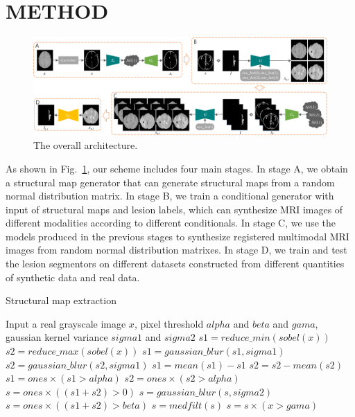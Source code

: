 \documentclass[runningheads]{llncs}
\begin{document}
\section{METHOD}
\label{method}
\begin{figure}[t]
	\centering
	\includegraphics[width=1\textwidth]{figures/architecture}
	\caption{The overall architecture. 
	}
	\label{architecture}
\end{figure}
As shown in Fig.~\ref{architecture}, our scheme includes four main stages. In stage A, we obtain a structural map generator that can generate structural maps from a random normal distribution matrix. 
In stage B, we train a conditional generator with input of structural maps and lesion labels, which can synthesize MRI images of different modalities according to different conditionals.
In stage C, we use the models produced in the previous stages to synthesize registered multimodal MRI images from random normal distribution matrixes. 
In stage D, we train and test the lesion segmentors on different datasets constructed from different quantities of synthetic data and real data.

\begin{algorithm}
	\caption{Structural map extraction}
	\label{alg:1}
	\begin{algorithmic}[1]
		\State Input a real grayscale image $x$,
		pixel threshold $alpha$ and $beta$ and $gama$,
		gaussian kernel variance $sigma1$ and $sigma2$
		\State $s1 = reduce\_min(sobel(x))$
		\State $s2 = reduce\_max(sobel(x))$
		\State $s1 = gaussian\_blur(s1,sigma1)$
		\State $s2 = gaussian\_blur(s2,sigma1)$
		\State $s1 = mean(s1) - s1$
		\State $s2 = s2 - mean(s2)$
		\State $s1 = ones \times (s1 > alpha)$
		\State $s2 = ones \times (s2 > alpha)$
		\State $s = ones \times ((s1 + s2)> 0)$
		\State $s = gaussian\_blur(s,sigma2)$
		\State $s = ones \times ((s1 + s2)> beta)$
		\State $s = medfilt(s)$
		\State $s = s \times (x > gama)$
	\end{algorithmic}  
\end{algorithm}
\end{document}
